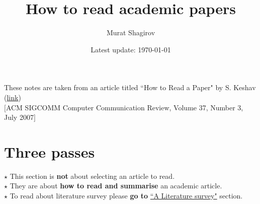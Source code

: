 \documentclass[a4paper]{article}
\title{How to read academic papers}
\author{Murat Shagirov}
\date{Latest update: \today}
\begin{document}
\maketitle

These notes are taken from an article titled ``How to Read a Paper" by S. Keshav (\href{http://ccr.sigcomm.org/online/files/p83-keshavA.pdf}{link})\\
$[$ACM SIGCOMM Computer Communication Review, Volume 37, Number 3, July 2007$]$

\section{Three passes}
\label{sec:1}
$\star$ This section is \textbf{not} about selecting an article to read.\\
$\star$ They are about \textbf{how to read and summarise} an academic article.\\
$\star$ To read about literature survey please \textbf{go to} \hyperref[sec:2]{``A Literature survey"} section.\\
\end{document}

